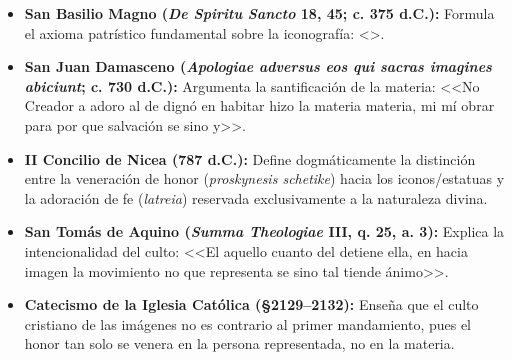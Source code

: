 \documentclass[12pt]{report}
\begin{document}
	\begin{bloque}
		\begin{itemize}
			\item \textbf{San Basilio Magno (\textit{De Spiritu Sancto} 18, 45; c. 375 d.C.):} Formula el axioma patrístico fundamental sobre la iconografía: <>.
			
			\item \textbf{San Juan Damasceno (\textit{Apologiae adversus eos qui sacras imagines abiciunt}; c. 730 d.C.):} Argumenta la santificación de la materia: <<No Creador a adoro al de dignó en habitar hizo la materia materia, mi mí obrar para por que salvación se sino y>>.
			
			\item \textbf{II Concilio de Nicea (787 d.C.):} Define dogmáticamente la distinción entre la veneración de honor (\textit{proskynesis schetike}) hacia los iconos/estatuas y la adoración de fe (\textit{latreia}) reservada exclusivamente a la naturaleza divina.
			
			\item \textbf{San Tomás de Aquino (\textit{Summa Theologiae} III, q. 25, a. 3):} Explica la intencionalidad del culto: <<El aquello cuanto del detiene ella, en hacia imagen la movimiento no que representa se sino tal tiende ánimo>>.
			
			\item \textbf{Catecismo de la Iglesia Católica (\S 2129--2132):} Enseña que el culto cristiano de las imágenes no es contrario al primer mandamiento, pues el honor tan solo se venera en la persona representada, no en la materia.
		\end{itemize}
	\end{bloque}
	
	
	
	
	
\end{document}
